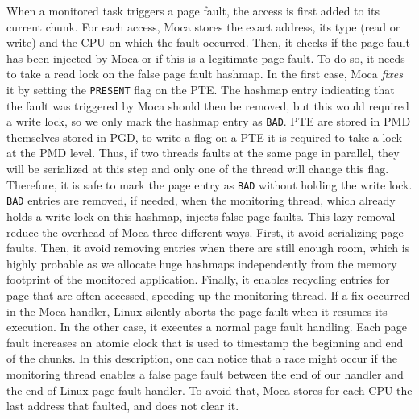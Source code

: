 When a monitored task triggers a page fault, the access is first added to its current chunk.
For each access, \gls{Moca} stores the exact address, its type (read or write) and the CPU on which the fault occurred.
Then, it checks if the page fault has been injected by \gls{Moca} or if this is a legitimate page fault.
To do so, it needs to take a read lock on the false page fault hashmap.
In the first case, \gls{Moca} \emph{fixes} it by setting the \texttt{PRESENT} flag on the \gls{PTE}.
The hashmap entry indicating that the fault was triggered by \gls{Moca} should then be removed, but this would required a write lock, so we only mark the hashmap entry as \texttt{BAD}.
\gls{PTE} are stored in \gls{PMD} themselves stored in \gls{PGD}, to write a flag on a \gls{PTE} it is required to take a lock at the \gls{PMD} level.
Thus, if two threads faults at the same page in parallel, they will be serialized at this step and only one of the thread will change this flag.
Therefore, it is safe to mark the page entry as \texttt{BAD} without holding the write lock.
\texttt{BAD} entries are removed, if needed, when the monitoring thread, which already holds a write lock on this hashmap, injects false page faults.
This lazy removal reduce the overhead of \gls{Moca} three different ways.
First, it avoid serializing page faults.
Then, it avoid removing entries when there are still enough room, which is highly probable as we allocate huge hashmaps independently from the memory footprint of the monitored application.
Finally, it enables recycling entries for page that are often accessed, speeding up the monitoring thread.
If a fix occurred in the \gls{Moca} handler, Linux silently aborts the page fault when it resumes its execution.
In the other case, it executes a normal page fault handling.
Each page fault increases an atomic clock that is used to timestamp the beginning and end of the chunks.
In this description, one can notice that a race might occur if the monitoring thread enables a false page fault between the end of our handler and the end of Linux page fault handler.
To avoid that, \gls{Moca} stores for each CPU the last address that faulted, and does not clear it.


